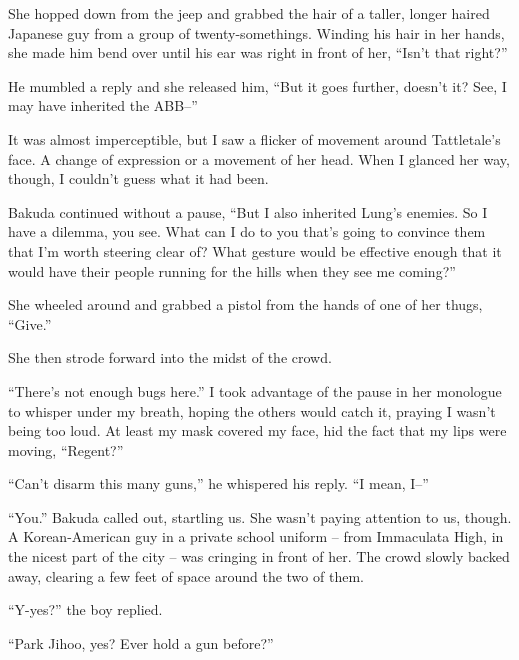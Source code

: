 She hopped down from the jeep and grabbed the hair of a taller, longer haired Japanese guy from a group of twenty-somethings.  Winding his hair in her hands, she made him bend over until his ear was right in front of her, ``Isn't that right?''



He mumbled a reply and she released him, ``But it goes further, doesn't it?  See, I may have inherited the ABB--''



It was almost imperceptible, but I saw a flicker of movement around Tattletale's face.  A change of expression or a movement of her head.  When I glanced her way, though, I couldn't guess what it had been.



Bakuda continued without a pause, ``But I also inherited Lung's enemies.  So I have a dilemma, you see.  What can I do to you that's going to convince them that I'm worth steering clear of?  What gesture would be effective enough that it would have their people running for the hills when they see me coming?''



She wheeled around and grabbed a pistol from the hands of one of her thugs, ``Give.''



She then strode forward into the midst of the crowd.



``There's not enough bugs here.'' I took advantage of the pause in her monologue to whisper under my breath, hoping the others would catch it, praying I wasn't being too loud.  At least my mask covered my face, hid the fact that my lips were moving, ``Regent?''



``Can't disarm this many guns,'' he whispered his reply. ``I mean, I--''



``You.'' Bakuda called out, startling us.  She wasn't paying attention to us, though.  A Korean-American guy in a private school uniform – from Immaculata High, in the nicest part of the city – was cringing in front of her.  The crowd slowly backed away, clearing a few feet of space around the two of them.



``Y-yes?'' the boy replied.



``Park Jihoo, yes?  Ever hold a gun before?''



